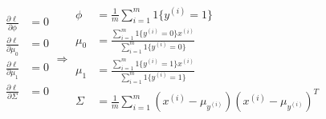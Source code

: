 \begin{answer}
    $$
    \begin{aligned}
        \frac{\partial\ell}{\partial \phi} &= 0\\
        \frac{\partial\ell}{\partial \mu_0} &= 0\\
        \frac{\partial\ell}{\partial \mu_1} &= 0\\
        \frac{\partial\ell}{\partial \Sigma} &= 0\\
    \end{aligned}
    \Rightarrow 
    \begin{aligned}
        \phi &= \frac{1}{m} \sum_{i=1}^m 1\{y^{(i)} = 1\} \\
        \mu_{0} &= \frac{\sum_{i=1}^m 1\{y^{(i)} = {0}\} x^{(i)}}{\sum_{i=1}^m
            1\{y^{(i)} = {0}\}} \\
        \mu_1 &= \frac{\sum_{i=1}^m 1\{y^{(i)} = 1\} x^{(i)}}{\sum_{i=1}^m 1\{y^{(i)}
        = 1\}} \\
        \Sigma &= \frac{1}{m} \sum_{i=1}^m (x^{(i)} - \mu_{y^{(i)}}) (x^{(i)} -
        \mu_{y^{(i)}})^T
    \end{aligned}
    $$
\end{answer}

